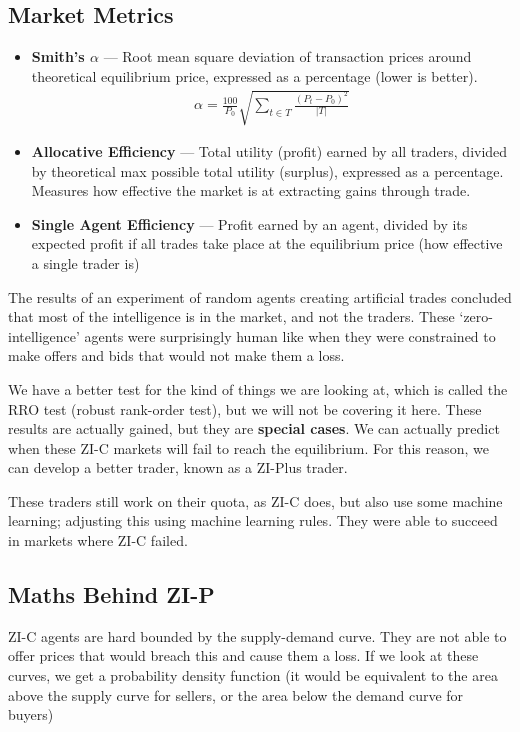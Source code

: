 \documentclass[11pt,a4paper,titlepage,dvipsnames,cmyk]{scrartcl}
\begin{document}
\subsection{Market Metrics}
\begin{itemize}
    \item \textbf{Smith's $\alpha$} --- Root mean square deviation of transaction prices around theoretical equilibrium price, expressed as a percentage (lower is better).
    \begin{align*}
    \alpha = \frac{100}{P_0} \sqrt{\sum_{t \in T} \frac{(P_t - P_0)^2}{|T|}}
    \end{align*}
    \item \textbf{Allocative Efficiency} --- Total utility (profit) earned by all traders, divided by theoretical max possible total utility (surplus), expressed as a percentage. Measures how effective the market is at extracting gains through trade.
    \item \textbf{Single Agent Efficiency} --- Profit earned by an agent, divided by its expected profit if all trades take place at the equilibrium price (how effective a single trader is)
\end{itemize}

The results of an experiment of random agents creating artificial trades concluded that most of the intelligence is in the market, and not the traders. These `zero-intelligence' agents were surprisingly human like when they were constrained to make offers and bids that would not make them a loss.

We have a better test for the kind of things we are looking at, which is called the RRO test (robust rank-order test), but we will not be covering it here.
These results are actually gained, but they are \textbf{special cases}. We can actually predict when these ZI-C markets will fail to reach the equilibrium. For this reason, we can develop a better trader, known as a ZI-Plus trader.

These traders still work on their quota, as ZI-C does, but also use some machine learning; adjusting this using machine learning rules. They were able to succeed in markets where ZI-C failed.

\subsection{Maths Behind ZI-P}
ZI-C agents are hard bounded by the supply-demand curve. They are not able to offer prices that would breach this and cause them a loss. If we look at these curves, we get a probability density function (it would be equivalent to the area above the supply curve for sellers, or the area below the demand curve for buyers)
\end{document}

